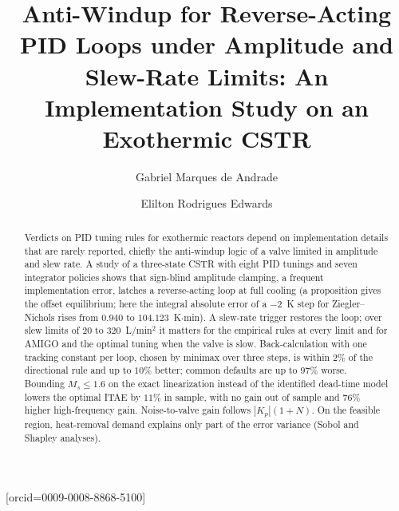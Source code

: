 \documentclass[a4paper,fleqn]{cas-dc}
\begin{document}
\let\WriteBookmarks\relax
\def\floatpagepagefraction{1}
\def\textpagefraction{.001}

\title [mode = title]{Anti-Windup for Reverse-Acting PID Loops under Amplitude and Slew-Rate Limits: An Implementation Study on an Exothermic CSTR}

\author[1]{Gabriel Marques de Andrade}[orcid=0009-0008-8868-5100]
\cormark[1]

\author[1]{Elilton Rodrigues Edwards}



\begin{abstract}
Verdicts on PID tuning rules for exothermic reactors depend on implementation details that are rarely reported, chiefly the anti-windup logic of a valve limited in amplitude and slew rate. A study of a three-state CSTR with eight PID tunings and seven integrator policies shows that sign-blind amplitude clamping, a frequent implementation error, latches a reverse-acting loop at full cooling (a proposition gives the offset equilibrium; here the integral absolute error of a $-2$~K step for Ziegler--Nichols rises from $0.940$ to $104.123$~K$\cdot$min). A slew-rate trigger restores the loop; over slew limits of $20$ to $320$~L/min$^2$ it matters for the empirical rules at every limit and for AMIGO and the optimal tuning when the valve is slow. Back-calculation with one tracking constant per loop, chosen by minimax over three steps, is within $2\%$ of the directional rule and up to $10\%$ better; common defaults are up to $97\%$ worse. Bounding $M_s \le 1.6$ on the exact linearization instead of the identified dead-time model lowers the optimal ITAE by $11\%$ in sample, with no gain out of sample and $76\%$ higher high-frequency gain. Noise-to-valve gain follows $|K_p|(1+N)$. On the feasible region, heat-removal demand explains only part of the error variance (Sobol and Shapley analyses).
\end{abstract}
\end{document}
